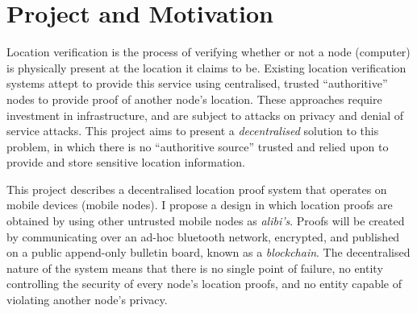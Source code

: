 \section{Project and Motivation}
Location verification is the process of verifying whether or not a  node (computer) is physically present at the location it claims to be. Existing location verification systems attept to provide this service using centralised, trusted ``authoritive'' nodes to provide proof of another node's location. These approaches require investment in infrastructure, and are subject to attacks on privacy and denial of service attacks. This project aims to present a \textit{decentralised} solution to this problem, in which there is no ``authoritive source'' trusted and relied upon to provide and store sensitive location information.

This project describes a decentralised location proof system that operates on mobile devices (mobile nodes). I propose a design in which location proofs are obtained by using other untrusted mobile nodes as \textit{alibi's}. Proofs will be created by communicating over an ad-hoc bluetooth network, encrypted, and published on a public append-only bulletin board, known as a \textit{blockchain}. The decentralised nature of the system means that there is no single point of failure, no entity controlling the security of every node's location proofs, and no entity capable of violating another node's privacy.